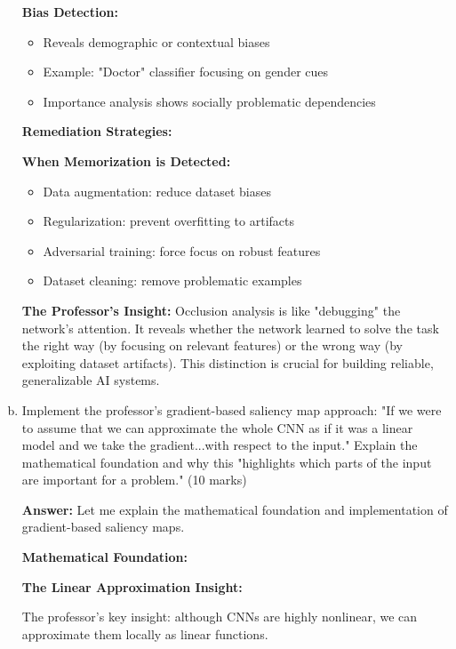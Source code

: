 \documentclass[12pt]{article}
\newcommand{\answer}[1]{{\color{answercolor}\textbf{Answer:} #1}}
\newcommand{\explanation}[1]{{\color{explanationcolor}#1}}
\begin{document}
\begin{enumerate}[(a)]
{{    \textbf{Bias Detection:}
    \begin{itemize}
        \item Reveals demographic or contextual biases
        \item Example: "Doctor" classifier focusing on gender cues
        \item Importance analysis shows socially problematic dependencies
    \end{itemize}
    }
    
    \textbf{Remediation Strategies:}
    
    \explanation{
    \textbf{When Memorization is Detected:}
    \begin{itemize}
        \item Data augmentation: reduce dataset biases
        \item Regularization: prevent overfitting to artifacts
        \item Adversarial training: force focus on robust features
        \item Dataset cleaning: remove problematic examples
    \end{itemize}
    }
    
    \textbf{The Professor's Insight:}
    \explanation{
    Occlusion analysis is like "debugging" the network's attention. It reveals whether the network learned to solve the task the right way (by focusing on relevant features) or the wrong way (by exploiting dataset artifacts). This distinction is crucial for building reliable, generalizable AI systems.
    }
    }
    
    \item Implement the professor's gradient-based saliency map approach: "If we were to assume that we can approximate the whole CNN as if it was a linear model and we take the gradient...with respect to the input." Explain the mathematical foundation and why this "highlights which parts of the input are important for a problem." \hfill (10 marks)
    
    \answer{
    Let me explain the mathematical foundation and implementation of gradient-based saliency maps.
    
    \textbf{Mathematical Foundation:}
    
    \explanation{
    \textbf{The Linear Approximation Insight:}
    
    The professor's key insight: although CNNs are highly nonlinear, we can approximate them locally as linear functions.
    
}}
\end{enumerate}
\end{document}
